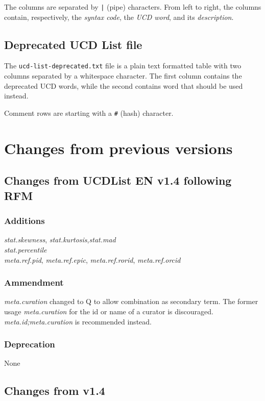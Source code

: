 \documentclass[11pt,a4paper]{ivoa}
\begin{document}
The columns are separated by \texttt{|} (pipe) characters. From left to right, the 
columns contain, respectively, the \emph{syntax code}, the \emph{UCD word}, and its
\emph{description}. 

\subsection{Deprecated UCD List file}
The \texttt{ucd-list-deprecated.txt} file is a plain text formatted table with two
columns separated by a whitespace character. The first column contains the deprecated 
UCD words, while the second contains word that should be used instead.

Comment rows are starting with a \texttt{\#} (hash) character.

\section{Changes from previous versions}
\subsection{Changes from UCDList EN v1.4 following RFM}
\subsubsection*{Additions}
\emph{stat.skewness}, \emph{stat.kurtosis},\emph{stat.mad} \\
\emph{stat.percentile} \\
\emph{meta.ref.pid}, \emph{meta.ref.epic}, \emph{meta.ref.rorid}, \emph{meta.ref.orcid} \\

\subsubsection*{Ammendment}
\emph{meta.curation} changed to Q to allow combination as secondary term. The former usage \emph{meta.curation} for the id or name of a curator is discouraged. \emph{meta.id;meta.curation} is recommended instead.

\subsubsection*{Deprecation}
None

\subsection{Changes from v1.4}
\end{document}
